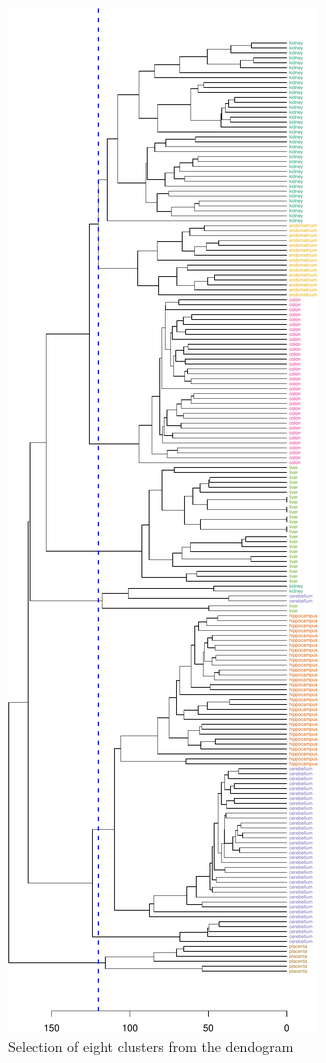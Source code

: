\documentclass[]{book}
\theoremstyle{definition}
\theoremstyle{definition}
\theoremstyle{definition}
\theoremstyle{remark}
\begin{document}
\begin{figure}

{\centering \includegraphics[width=1\linewidth]{09-clustering_files/figure-latex/tissueDendrogramEightClusters-1} 

}

\caption{Selection of eight clusters from the dendogram}\label{fig:tissueDendrogramEightClusters}
\end{figure}
\end{document}
